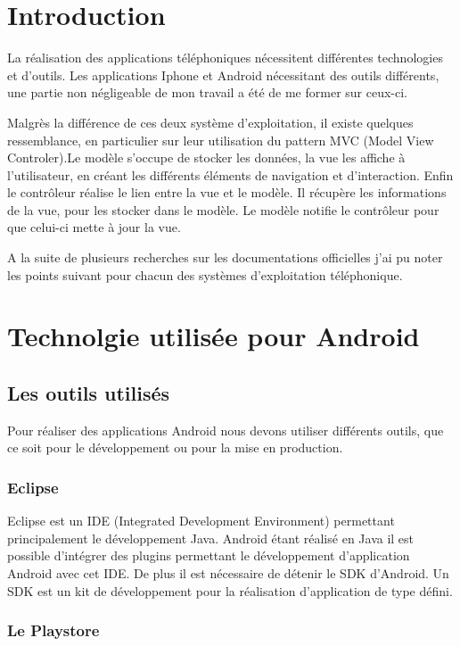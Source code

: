 \section{Introduction}

La réalisation des applications téléphoniques nécessitent différentes technologies et d'outils. Les applications Iphone et Android nécessitant des outils différents, une partie non négligeable de mon travail a été de me former sur ceux-ci.

Malgrès la différence de ces deux système d'exploitation, il existe quelques ressemblance, en particulier sur leur utilisation du pattern MVC (Model View Controler).Le modèle s’occupe de stocker les données, la vue les affiche à l’utilisateur, en créant les différents éléments de navigation et d'interaction. Enfin le contrôleur réalise le lien entre la vue et le modèle. Il récupère les informations de la vue, pour les stocker dans le modèle. Le modèle notifie le contrôleur pour que celui-ci mette à jour la vue.

A la suite de plusieurs recherches sur les documentations officielles j'ai pu noter les points suivant pour chacun des systèmes d'exploitation téléphonique.

\section{Technolgie utilisée pour Android}

\subsection{Les outils utilisés}

Pour réaliser des applications Android nous devons utiliser différents outils, que ce soit pour le développement ou pour la mise en production.

\subsubsection{Eclipse}

Eclipse est un IDE (Integrated Development Environment) permettant principalement le développement Java. Android étant réalisé en Java il est possible d'intégrer des plugins permettant le développement d'application Android avec cet IDE. De plus il est nécessaire de détenir le SDK d'Android. Un SDK est un kit de développement pour la réalisation d'application de type défini.

\subsubsection{Le Playstore}

